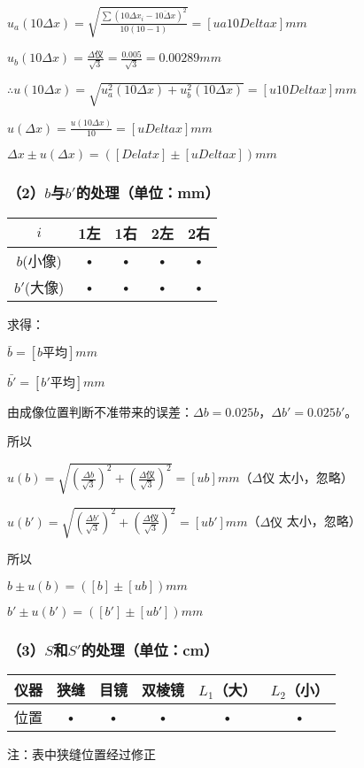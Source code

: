 \documentclass[11pt,a4paper,oneside]{article}
\begin{document}
$u_a(10\Delta x) = \sqrt{\displaystyle\frac{\sum (10\Delta x_i-\overline{10\Delta x})^2}{10(10-1)}} = [ua10Deltax]mm$

$u_b(10\Delta x) = \displaystyle\frac{\Delta 仪}{\sqrt{3}} = \displaystyle\frac{0.005}{\sqrt{3}} = 0.00289mm$

$\therefore u(10\Delta x) = \sqrt{u_a^2(10\Delta x)+u_b^2(10\Delta x)} = [u10Delta x]mm$

$u(\Delta x) = \displaystyle\frac{u(10\Delta x)}{10} = [uDelta x]mm$

$\Delta x \pm u(\Delta x) = ([Delat x]\pm [uDelta x])mm$
\subsubsection{（2）$b$与$b'$的处理（单位：mm）}

\begin{tabular}{|c|c|c|c|c|}
\hline 
$i$ & 1左 & 1右 & 2左 & 2右 \\ 
\hline 
$b$(小像) & • & • & • & • \\ 
\hline 
$b'$(大像) & • & • & • & • \\ 
\hline 
\end{tabular} 
求得：

$\bar{b} = [b平均]mm$

$\bar{b'} = [b'平均]mm$

由成像位置判断不准带来的误差：$\Delta b = 0.025b$，$\Delta b' = 0.025b'$。

所以

$u(b) = \sqrt{(\displaystyle\frac{\Delta b}{\sqrt{3}})^2+(\displaystyle\frac{\Delta 仪}{\sqrt{3}})^2} = [ub]mm$（$\Delta 仪$ 太小，忽略）

$u(b') = \sqrt{(\displaystyle\frac{\Delta b'}{\sqrt{3}})^2+(\displaystyle\frac{\Delta 仪}{\sqrt{3}})^2} = [ub']mm$（$\Delta 仪$ 太小，忽略）

所以

$b \pm u(b) = ([b]\pm [ub])mm$

$b' \pm u(b') = ([b']\pm [ub'])mm$

\subsubsection{（3）$S$和$S'$的处理（单位：cm）}
\begin{tabular}{|c|c|c|c|c|c|}
\hline 
仪器 & 狭缝 & 目镜 & 双棱镜 & $L_1$（大） & $L_2$（小） \\ 
\hline 
位置 & • & • & • & • & • \\ 
\hline 
\end{tabular} 
注：表中狭缝位置经过修正
\end{document}
